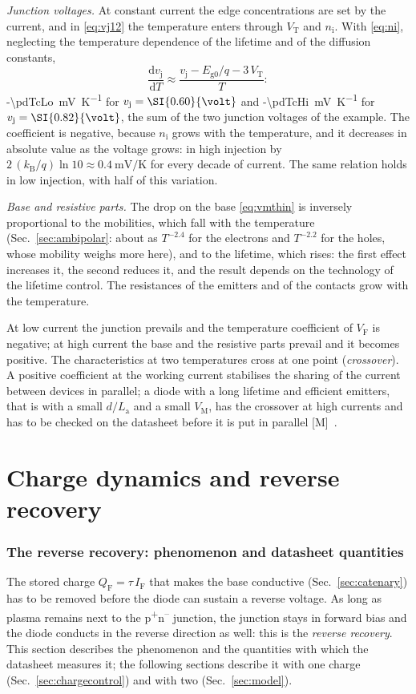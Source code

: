 \documentclass[10pt,a4paper]{scrartcl}
\newcommand{\IF}{I_\mathrm{F}}
\newcommand{\VF}{V_\mathrm{F}}
\newcommand{\vj}{v_\mathrm{j}}
\newcommand{\VT}{V_\mathrm{T}}
\newcommand{\diff}{\mathrm{d}}
\newcommand{\nint}{n_\mathrm{i}}
\newcommand{\La}{L_\mathrm{a}}
\newcommand{\VM}{V_\mathrm{M}}
\newcommand{\QF}{Q_\mathrm{F}}
\newcommand{\kB}{k_\mathrm{B}}
\newcommand{\Pp}{p\textsuperscript{+}}
\newcommand{\Nm}{n\textsuperscript{--}}
\begin{document}
\emph{Junction voltages.} At constant current the edge concentrations are set by the current, and in \eqref{eq:vj12} the temperature enters through $\VT$ and $\nint$. With \eqref{eq:ni}, neglecting the temperature dependence of the lifetime and of the diffusion constants,
\begin{equation}
\frac{\diff\vj}{\diff T} \approx \frac{\vj - E_\mathrm{g0}/q - 3\,\VT}{T} :
\label{eq:tc}
\end{equation}
\SI{-\pdTcLo}{\milli\volt\per\kelvin} for $\vj = \SI{\pdTcVjLo}{\volt}$ and \SI{-\pdTcHi}{\milli\volt\per\kelvin} for $\vj = \SI{\pdTcVjHi}{\volt}$, the sum of the two junction voltages of the example. The coefficient is negative, because $\nint$ grows with the temperature, and it decreases in absolute value as the voltage grows: in high injection by $2\,(\kB/q)\ln 10 \approx \SI{0.4}{\milli\volt\per\kelvin}$ for every decade of current. The same relation holds in low injection, with half of this variation.

\emph{Base and resistive parts.} The drop on the base \eqref{eq:vmthin} is inversely proportional to the mobilities, which fall with the temperature (Sec.~\ref{sec:ambipolar}: about as $T^{-2.4}$ for the electrons and $T^{-2.2}$ for the holes, whose mobility weighs more here), and to the lifetime, which rises: the first effect increases it, the second reduces it, and the result depends on the technology of the lifetime control. The resistances of the emitters and of the contacts grow with the temperature.

At low current the junction prevails and the temperature coefficient of $\VF$ is negative; at high current the base and the resistive parts prevail and it becomes positive. The characteristics at two temperatures cross at one point (\emph{crossover}). A positive coefficient at the working current stabilises the sharing of the current between devices in parallel; a diode with a long lifetime and efficient emitters, that is with a small $d/\La$ and a small $\VM$, has the crossover at high currents and has to be checked on the datasheet before it is put in parallel [M]~\cite{lutz}.
\part{Charge dynamics and reverse recovery}

\section{The reverse recovery: phenomenon and datasheet quantities}
\label{sec:datasheet}
The stored charge $\QF = \tau\,\IF$ that makes the base conductive (Sec.~\ref{sec:catenary}) has to be removed before the diode can sustain a reverse voltage. As long as plasma remains next to the \Pp\Nm{} junction, the junction stays in forward bias and the diode conducts in the reverse direction as well: this is the \emph{reverse recovery}. This section describes the phenomenon and the quantities with which the datasheet measures it; the following sections describe it with one charge (Sec.~\ref{sec:chargecontrol}) and with two (Sec.~\ref{sec:model}).
\end{document}
